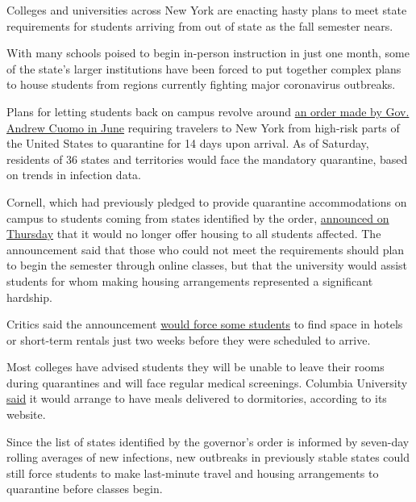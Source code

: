 Colleges and universities across New York are enacting hasty plans to
meet state requirements for students arriving from out of state as the
fall semester nears.

With many schools poised to begin in-person instruction in just one
month, some of the state's larger institutions have been forced to put
together complex plans to house students from regions currently fighting
major coronavirus outbreaks.

Plans for letting students back on campus revolve around
\href{https://www.nytimes.com/2020/06/24/nyregion/ny-coronavirus-states-quarantine.html}{an
order made by Gov. Andrew Cuomo in June} requiring travelers to New York
from high-risk parts of the United States to quarantine for 14 days upon
arrival. As of Saturday, residents of 36 states and territories would
face the mandatory quarantine, based on trends in infection data.

Cornell, which had previously pledged to provide quarantine
accommodations on campus to students coming from states identified by
the order,
\href{https://covid.cornell.edu/updates/20200730-important-updates.cfm}{announced
on Thursday} that it would no longer offer housing to all students
affected. The announcement said that those who could not meet the
requirements should plan to begin the semester through online classes,
but that the university would assist students for whom making housing
arrangements represented a significant hardship.

Critics said the announcement
\href{https://cornellsun.com/2020/07/31/editorial-cornells-inability-to-quarantine-arriving-students-should-concern-you/}{would
force some students} to find space in hotels or short-term rentals just
two weeks before they were scheduled to arrive.

Most colleges have advised students they will be unable to leave their
rooms during quarantines and will face regular medical screenings.
Columbia University
\href{https://roomselection.housing.columbia.edu/}{said} it would
arrange to have meals delivered to dormitories, according to its
website.

Since the list of states identified by the governor's order is informed
by seven-day rolling averages of new infections, new outbreaks in
previously stable states could still force students to make last-minute
travel and housing arrangements to quarantine before classes begin.

\hypertarget{-10}{%
\subsection{}\label{-10}}

